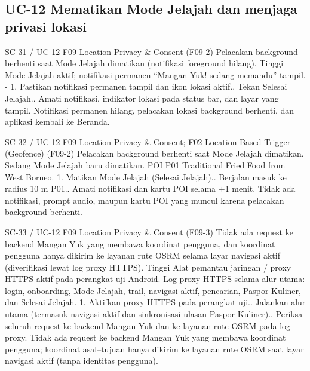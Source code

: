 \subsection*{UC-12 Mematikan Mode Jelajah dan menjaga privasi lokasi}

\renewcommand{\tcactual}{Sesuai ekspektasi pada perangkat Android (Teardown sesi lolos (\texttt{01-geofence})). Notifikasi permanen hilang, pelacakan lokasi background berhenti, dan aplikasi kembali ke Beranda.}
{SC-31 / UC-12}
{F09 Location Privacy \& Consent}
{(F09-2) Pelacakan background berhenti saat Mode Jelajah dimatikan (notifikasi foreground hilang).}
{Tinggi}
{Mode Jelajah aktif; notifikasi permanen ``Mangan Yuk! sedang memandu'' tampil.}
{-}
{1. Pastikan notifikasi permanen tampil dan ikon lokasi aktif.. Tekan Selesai Jelajah.. Amati notifikasi, indikator lokasi pada status bar, dan layar yang tampil.}
{Notifikasi permanen hilang, pelacakan lokasi background berhenti, dan aplikasi kembali ke Beranda.}

\renewcommand{\tcactual}{Sesuai ekspektasi pada perangkat Android (Teardown sesi lolos (\texttt{01-geofence})). Tidak ada notifikasi, prompt audio, maupun kartu POI yang muncul karena pelacakan background berhenti.}
{SC-32 / UC-12}
{F09 Location Privacy \& Consent; F02 Location-Based Trigger (Geofence)}
{(F09-2) Pelacakan background berhenti saat Mode Jelajah dimatikan.}
{Sedang}
{Mode Jelajah baru dimatikan.}
{POI P01 Traditional Fried Food from West Borneo.}
{1. Matikan Mode Jelajah (Selesai Jelajah).. Berjalan masuk ke radius 10 m P01.. Amati notifikasi dan kartu POI selama \(\pm\)1 menit.}
{Tidak ada notifikasi, prompt audio, maupun kartu POI yang muncul karena pelacakan background berhenti.}

\renewcommand{\tcactual}{Sesuai ekspektasi pada perangkat Android (Zero-location payload lolos (\texttt{08-privacy})). Tidak ada request ke backend Mangan Yuk yang membawa koordinat pengguna; koordinat asal--tujuan hanya dikirim ke layanan rute OSRM saat layar navigasi aktif (tanpa identitas pengguna).}
{SC-33 / UC-12}
{F09 Location Privacy \& Consent}
{(F09-3) Tidak ada request ke backend Mangan Yuk yang membawa koordinat pengguna, dan koordinat pengguna hanya dikirim ke layanan rute OSRM selama layar navigasi aktif (diverifikasi lewat log proxy HTTPS).}
{Tinggi}
{Alat pemantau jaringan / proxy HTTPS aktif pada perangkat uji Android.}
{Log proxy HTTPS selama alur utama: login, onboarding, Mode Jelajah, trail, navigasi aktif, pencarian, Paspor Kuliner, dan Selesai Jelajah.}
{1. Aktifkan proxy HTTPS pada perangkat uji.. Jalankan alur utama (termasuk navigasi aktif dan sinkronisasi ulasan Paspor Kuliner).. Periksa seluruh request ke backend Mangan Yuk dan ke layanan rute OSRM pada log proxy.}
{Tidak ada request ke backend Mangan Yuk yang membawa koordinat pengguna; koordinat asal--tujuan hanya dikirim ke layanan rute OSRM saat layar navigasi aktif (tanpa identitas pengguna).}

